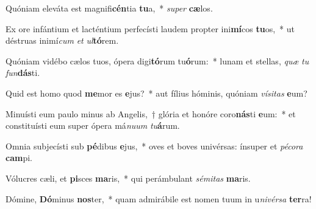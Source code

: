 \item Quóniam eleváta est magnifi\textbf{cén}tia \textbf{tu}a,~* \textit{su}\textit{per} \textbf{cæ}los.
\item Ex ore infántium et lacténtium perfecísti laudem propter ini\textbf{mí}cos \textbf{tu}os,~* ut déstruas inimí\textit{cum} \textit{et} \textit{ul}\textbf{tó}rem.
\item Quóniam vidébo cælos tuos, ópera digi\textbf{tó}rum tu\textbf{ó}rum:~* lunam et stellas, \textit{quæ} \textit{tu} \textit{fun}\textbf{dás}ti.
\item Quid est homo quod \textbf{me}mor es \textbf{e}jus?~* aut fílius hóminis, quóniam \textit{ví}\textit{si}\textit{tas} \textbf{e}um?
\item Minuísti eum paulo minus ab Angelis,~† glória et honóre coro\textbf{nás}ti \textbf{e}um:~* et constituísti eum super ópera má\textit{nu}\textit{um} \textit{tu}\textbf{á}rum.
\item Omnia subjecísti sub \textbf{pé}dibus \textbf{e}jus,~* oves et boves univérsas: ínsuper et \textit{pé}\textit{co}\textit{ra} \textbf{cam}pi.
\item Vólucres cæli, et \textbf{pi}sces \textbf{ma}ris,~* qui perámbulant \textit{sé}\textit{mi}\textit{tas} \textbf{ma}ris.
\item Dómine, \textbf{Dó}minus \textbf{nos}ter,~* quam admirábile est nomen tuum in u\textit{ni}\textit{vér}\textit{sa} \textbf{ter}ra!
